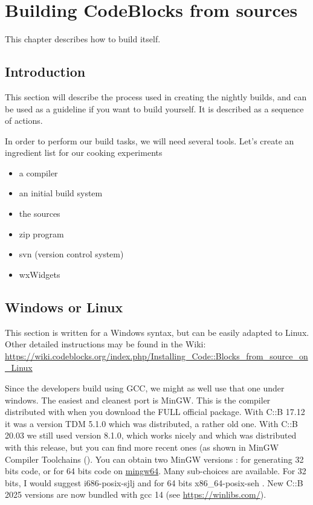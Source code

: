 \chapter{Building CodeBlocks from sources}\label{sec:build_codeblocks}

This chapter describes how to build \codeblocks itself.


\section{Introduction}

This section will describe the process used in creating the nightly builds, and can be used as a guideline if you want to build \codeblocks yourself. It is described as a sequence of actions.

In order to perform our build tasks, we will need several tools. Let's create an ingredient list for our cooking experiments

\begin{itemize}[noitemsep]
\item a compiler
\item an initial build system
\item the \codeblocks sources
\item zip program
\item svn (version control system)
\item wxWidgets
\end{itemize}

\section{Windows or Linux}

This section is written for a Windows syntax, but can be easily adapted to Linux. 
Other detailed instructions may be found in the Wiki: \url{ https://wiki.codeblocks.org/index.php/Installing_Code::Blocks_from_source_on_Linux}

Since the \codeblocks developers build \codeblocks using GCC, we might as well use that one under windows. The easiest and cleanest port is MinGW. This is the compiler distributed with \codeblocks when you download the FULL official package. With C::B 17.12 it was a version TDM 5.1.0 which was distributed, a rather old one. With C::B 20.03 we still used version 8.1.0, which works nicely and which was distributed with this \codeblocks release, but you can find more recent ones (as shown in MinGW Compiler Toolchains (). You can obtain two MinGW versions : for generating 32 bits code, or for 64 bits code on \href{https://sourceforge.net/projects/mingw-w64/files/}{mingw64}. Many sub-choices are available. For 32 bits, I would suggest i686-posix-sjlj and for 64 bits x86\_64-posix-seh \cite{url:mingw64}. New C::B 2025 versions are now bundled with gcc 14 (see \url{https://winlibs.com/}).

